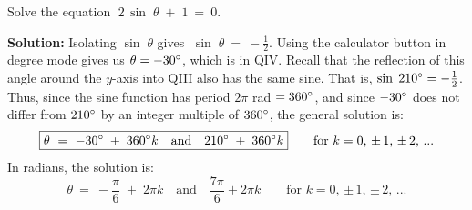 \begin{exmp}
 Solve the equation $\;2\,\sin\;\theta \;+\;1 ~=~ 0$.\vspace{1mm}
 \par\noindent\textbf{Solution:} Isolating $\sin\;\theta$ gives $\;\sin\;\theta ~=~ -\tfrac{1}{2}$.
 Using the {\setlength\fboxsep{1pt}} calculator button in degree
 mode gives us $\theta = -30^\circ$, which is in QIV. Recall that the reflection of this angle
 around the $y$-axis into QIII also has the same sine. That is, $\sin\;210^\circ = -\tfrac{1}{2}$.
 Thus, since the sine function has period $2\pi$ rad $= 360^\circ$, and since $-30^\circ$ does
 not differ from $210^\circ$ by an integer multiple of $360^\circ$, the general solution is:
 \begin{displaymath}
  \boxed{\theta ~=~ -30^\circ \;+\; 360^\circ k \quad\text{and}\quad 210^\circ \;+\;
   360^\circ k} \qquad\text{for $k=0$, $\pm\,1$, $\pm\,2$, $...$}
 \end{displaymath}
 In radians, the solution is:
 \begin{displaymath}
  \boxed{\theta ~=~ -\dfrac{\pi}{6} \;+\; 2\pi k \quad\text{and}\quad \dfrac{7\pi}{6} + 2\pi k}
   \qquad\text{for $k=0$, $\pm\,1$, $\pm\,2$, $...$}
 \end{displaymath}
\end{exmp}
\divider
\vspace{1mm}

